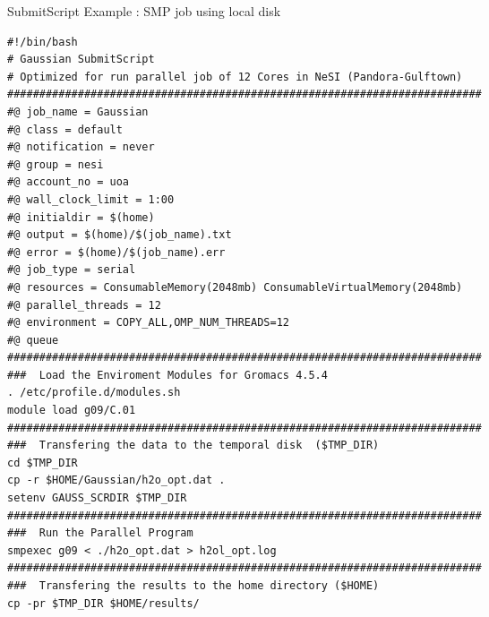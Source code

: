 \documentclass[final,t]{beamer}
\begin{document}
 \begin{frame}[fragile]{} 
  \begin{columns}[t]
    \begin{column}{.35\linewidth}


      \begin{block}{SubmitScript Example : SMP job using local disk}
              \vspace*{-3ex}
        \begin{verbatim}
#!/bin/bash 
# Gaussian SubmitScript 
# Optimized for run parallel job of 12 Cores in NeSI (Pandora-Gulftown)
##########################################################################
#@ job_name = Gaussian
#@ class = default
#@ notification = never
#@ group = nesi
#@ account_no = uoa
#@ wall_clock_limit = 1:00
#@ initialdir = $(home)
#@ output = $(home)/$(job_name).txt
#@ error = $(home)/$(job_name).err
#@ job_type = serial
#@ resources = ConsumableMemory(2048mb) ConsumableVirtualMemory(2048mb)
#@ parallel_threads = 12
#@ environment = COPY_ALL,OMP_NUM_THREADS=12
#@ queue
########################################################################## 
###  Load the Enviroment Modules for Gromacs 4.5.4
. /etc/profile.d/modules.sh
module load g09/C.01
##########################################################################
###  Transfering the data to the temporal disk  ($TMP_DIR)
cd $TMP_DIR
cp -r $HOME/Gaussian/h2o_opt.dat . 
setenv GAUSS_SCRDIR $TMP_DIR
##########################################################################
###  Run the Parallel Program
smpexec g09 < ./h2o_opt.dat > h2ol_opt.log
##########################################################################
###  Transfering the results to the home directory ($HOME) 
cp -pr $TMP_DIR $HOME/results/
        \end{verbatim}
                \vspace*{-4ex}
      \end{block}


\end{column}
\end{columns}
\end{frame}
\end{document}
